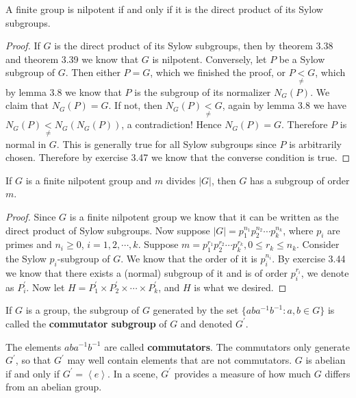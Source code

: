 \begin{proposition}
A finite group is nilpotent if and only if it is the direct product of its Sylow subgroups.
\end{proposition}
\begin{proof}
If $G$ is the direct product of its Sylow subgroups, then by theorem 3.38 and theorem 3.39 we know that $G$ is nilpotent. Conversely, let $P$ be a Sylow subgroup of $G$. Then either $P=G$, which we finished the proof, or $P\underset{\ne}{<}G$, which by lemma 3.8 we know that $P$ is the subgroup of its normalizer $N_G(P)$. We claim that $N_G(P)=G$. If not, then $N_G\left( P \right) \underset{\ne}{<}G$, again by lemma 3.8 we have $N_G\left( P \right) \underset{\ne}{<}N_G\left( N_G\left( P \right) \right) $, a contradiction! Hence $N_G(P)=G$. Therefore $P$ is normal in $G$. This is generally true for all Sylow subgroups since $P$ is arbitrarily chosen. Therefore by exercise 3.47 we know that the converse condition is true.
\end{proof}
\begin{corollary}
If $G$ is a finite nilpotent group and $m$ divides $|G|$, then $G$ has a subgroup of order $m$.
\end{corollary}
\begin{proof}
Since $G$ is a finite nilpotent group we know that it can be written as the direct product of Sylow subgroups. Now suppose $\left| G \right|=p_{1}^{n_1}p_{2}^{n_2}\cdots p_{k}^{n_k}$, where $p_i$ are primes and $n_i\ge 0$, $i=1,2,\cdots,k$. Suppose $m=p_{1}^{r_1}p_{2}^{r_2}\cdots p_{k}^{r_k},0\le r_k\le n_k$. Consider the Sylow $p_i$-subgroup of $G$. We know that the order of it is $p_i^{n_i}$. By exercise 3.44 we know that there exists a (normal) subgroup of it and is of order $p_i^{r_i}$, we denote as $P_i^\prime$. Now let $H=P_{1}^{\prime}\times P_{2}^{\prime}\times \cdots \times P_{k}^{\prime}$, and $H$ is what we desired.
\end{proof}
\begin{definition}
If $G$ is a group, the subgroup of $G$ generated by the set $\{aba^{-1}b^{-1}:a,b\in G\}$ is called the \textbf{commutator subgroup} of $G$ and denoted $G^\prime$.
\end{definition}
The elements $aba^{-1}b^{-1}$ are called \textbf{commutators}. The commutators only generate $G^\prime$, so that $G^\prime$ may well contain elements that are not commutators. $G$ is abelian if and only if $G^\prime=\left<e\right>$. In a scene, $G^\prime$ provides a measure of how much $G$ differs from an abelian group. 
